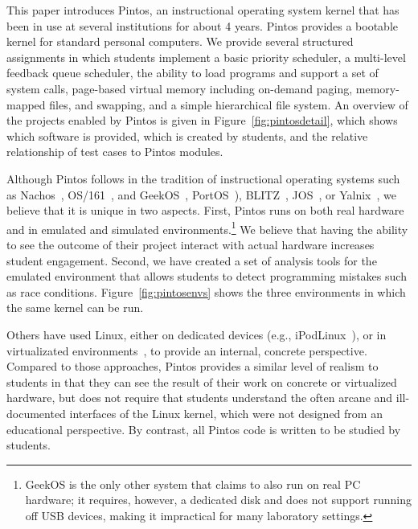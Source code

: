 This paper introduces Pintos, an instructional operating system kernel that 
has been in use at several institutions for about 4 years.  Pintos provides 
a bootable kernel for standard personal computers.  We provide several
structured assignments in which students implement a basic priority
scheduler, a multi-level feedback queue scheduler, the ability to
load programs and support a set of system calls, page-based virtual memory
including on-demand paging, memory-mapped files, and swapping, and a
simple hierarchical file system.  An overview of the projects enabled
by Pintos is given in Figure~\ref{fig:pintosdetail}, which shows which
software is provided, which is created by students, and the relative 
relationship of test cases to Pintos modules.

Although Pintos follows in the tradition of instructional operating systems 
such as Nachos~\cite{Christopher1993Nachos}, OS/161~\cite{Holland2002New}, and
GeekOS~\cite{Hovemeyer2004Running}, 
PortOS~\cite{Atkin2002PortOS}),
BLITZ~\cite{PorterOverview},
JOS~\cite{1088822}, or Yalnix~\cite{1088822},
we believe that it is unique in two
aspects.  First, Pintos runs on both real hardware and in emulated and
simulated environments.\footnote{\small GeekOS is the only other system that claims to 
also run on real PC hardware; it requires, however, a dedicated disk and 
does not support running off USB devices, making it impractical for many 
laboratory settings.}  We believe that having the ability to see the outcome
of their project interact with actual hardware increases student engagement.
Second, we have created a set of analysis tools
for the emulated environment that allows students to detect programming
mistakes such as race conditions.  Figure~\ref{fig:pintosenvs} shows
the three environments in which the same kernel can be run.

Others have used Linux, either on dedicated devices (e.g., iPodLinux~\cite{1352199}),
or in virtualizated environments~\cite{1008027,1352648,Nieh2005Experiences}, to provide
an internal, concrete perspective.  Compared to those approaches, Pintos provides
a similar level of realism to students in that they can see the result of their
work on concrete or virtualized hardware, but does not require that students 
understand the often arcane and ill-documented interfaces of the Linux kernel,
which were not designed from an educational perspective.  By contrast, all
Pintos code is written to be studied by students.


\pintosenvfigure{}

\pintosdetailfigure{}



